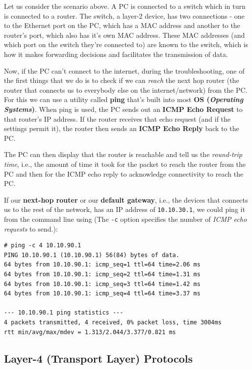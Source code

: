 \noindent
Let us consider the scenario above. A PC is connected to a switch which in turn is connected to a router. The switch, a layer-2 device, has two connections - one to the Ethernet port on the PC, which has a MAC address and another to the router's port, which also has it's own MAC address. These MAC addresses (and which port on the switch they're connected to) are known to the switch, which is how it makes forwarding decisions and facilitates the transmission of data. 

Now, if the PC can't connect to the internet, during the troubleshooting, one of the first things that we do is to check if we can \textit{reach} the next hop router (the router that connects us to everybody else on the internet/network) from the PC. For this we can use a utility called \textbf{ping} that's built into most \textbf{OS (\textit{Operating Systems})}. When ping is used, the PC sends out an \textbf{ICMP Echo Request} to that router's IP address. If the router receives that echo request (and if the settings permit it), the router then sends an \textbf{ICMP Echo Reply} back to the PC. 

The PC can then display that the router is reachable and tell us the \textit{round-trip time}, i.e., the amount of time it took for the packet to reach the router from the PC and then for the ICMP echo reply to acknowledge connectivity to reach the PC. 

If our \textbf{next-hop router} or our \textbf{default gateway}, i.e., the devices that connects us to the rest of the network, has an IP address of \verb|10.10.30.1|, we could ping it from the command line using (The \verb|-c| option specifies the number of \textit{ICMP echo requests} to send.):

\begin{verbatim}
# ping -c 4 10.10.90.1
PING 10.10.90.1 (10.10.90.1) 56(84) bytes of data.
64 bytes from 10.10.90.1: icmp_seq=1 ttl=64 time=2.06 ms
64 bytes from 10.10.90.1: icmp_seq=2 ttl=64 time=1.31 ms
64 bytes from 10.10.90.1: icmp_seq=3 ttl=64 time=1.42 ms
64 bytes from 10.10.90.1: icmp_seq=4 ttl=64 time=3.37 ms

--- 10.10.90.1 ping statistics ---
4 packets transmitted, 4 received, 0% packet loss, time 3004ms
rtt min/avg/max/mdev = 1.313/2.044/3.377/0.821 ms	
\end{verbatim}

\subsection{Layer-4 (Transport Layer) Protocols}
